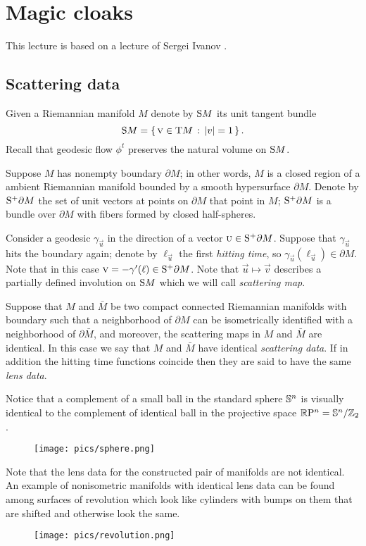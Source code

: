 \chapter{Magic cloaks}

This lecture is based on a lecture of Sergei Ivanov \cite{ivanov-2012}.

\section{Scattering data}

Given a Riemannian manifold $M$ denote by $\S M$ its unit tangent bundle
\[\S M=\set{\vec v\in \T M}{|v|=1}.\]
Recall that geodesic flow $\phi^t$ preserves the natural volume on $\S M$.

Suppose $M$ has nonempty boundary $\partial M$;
in other words, $M$ is a closed region of a ambient Riemannian  manifold bounded by a smooth hypersurface $\partial M$.
Denote by $\S^+ \partial M$ the set of unit vectors at points on $\partial M$ that point in $M$;
$\S^+ \partial M$ is a bundle over $\partial M$ with fibers formed by closed half-spheres.

Consider a geodesic $\gamma_{\vec u}$ in the direction of a vector $\vec u\in \S^+ \partial M$.
Suppose that $\gamma_{\vec u}$ hits the boundary again; 
denote by $\ell_{\vec u}$ the first \emph{hitting time}, so $\gamma_{\vec u}(\ell_{\vec u})\in \partial M$.
Note that in this case $\vec v=-\gamma'(\ell)\in \S^+ \partial M$.
Note that $\vec u\mapsto \vec v$ describes a partially defined involution on $\S M$ which we will call \emph{scattering map}.

Suppose that $M$ and $\bar M$ be two compact connected Riemannian manifolds with boundary such that a neighborhood of $\partial M$ can be isometrically identified with a neighborhood of $\partial \bar M$,
and moreover, the scattering maps in $M$ and $\bar M$ are identical.
In this case we say that $M$ and $\bar M$ have identical  \emph{scattering data}.
If in addition the hitting time functions coincide then they are said to have the same \emph{lens data}.

Notice that a complement of a small ball in the standard sphere $\SSS^n$ is visually identical to the complement of identical ball in the projective space $\RP^n=\SSS^n/\ZZ_2$.
\begin{figure}[h!]
\centering
\texttt{[image: pics/sphere.png]}
\end{figure}

Note that the lens data for the constructed pair of manifolds are not identical.
An example of nonisometric manifolds with identical lens data can be found among surfaces of revolution which look like cylinders with bumps on them that are shifted and otherwise look the same.
\begin{figure}[h!]
\centering
\texttt{[image: pics/revolution.png]}
\end{figure}

